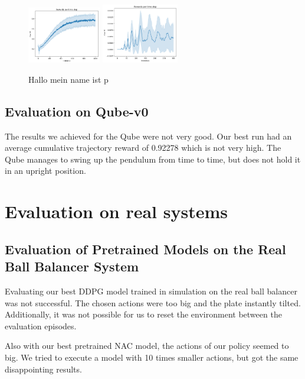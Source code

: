 \begin{figure}
\begin{center}
		\hspace{4mm}
		\includegraphics[width=0.285\textwidth]{plots/NAC_BBtime_step_reward.png}
		\hspace{1mm}
		\includegraphics[width=0.3\textwidth]{plots/NAC_Qube_time_step_reward.png}
		\hspace{1.5mm}
		\caption{Hallo mein name ist p}
		\label{nac:cp}
	\end{center}
\end{figure}

\subsection{Evaluation on Qube-v0}

The results we achieved for the Qube were not very good. Our best run had an average cumulative trajectory reward of 0.92278 which is not very high. The Qube manages to swing up the pendulum from time to time, but does not hold it in an upright position. 

\section{Evaluation on real systems}

\subsection{Evaluation of Pretrained Models on the Real Ball Balancer System}

Evaluating our best DDPG model trained in simulation on the real ball balancer was not successful. The chosen actions were too big and the plate instantly tilted. Additionally, it was not possible for us to reset the environment between the evaluation episodes.

Also with our best pretrained NAC model, the actions of our policy seemed to big. We tried to execute a model with 10 times smaller actions, but got the same disappointing results.

